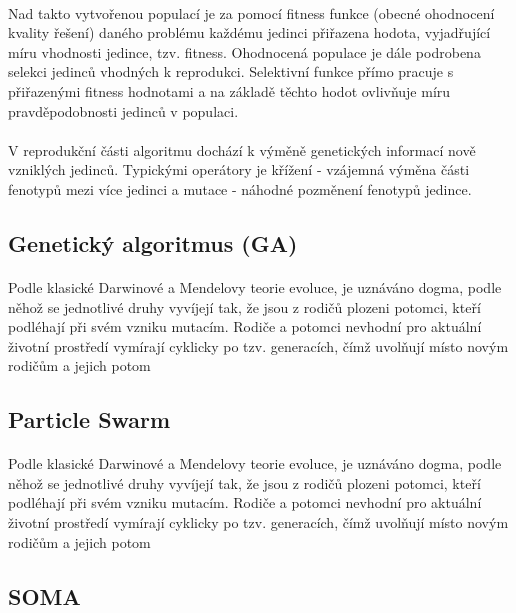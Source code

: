 \documentclass[bc,male,java,dept460]{diploma}		%
\begin{document}
\paragraph*{}
Nad takto vytvořenou populací je za pomocí fitness funkce (obecné ohodnocení kvality řešení) daného problému každému jedinci přiřazena hodota, vyjadřující míru vhodnosti jedince, tzv. fitness. Ohodnocená populace je dále podrobena selekci jedinců vhodných k reprodukci. Selektivní funkce přímo pracuje s přiřazenými fitness hodnotami a na základě těchto hodot ovlivňuje míru pravděpodobnosti jedinců v populaci.

\paragraph*{}
V reprodukční části algoritmu dochází k výměně genetických informací nově vzniklých jedinců. Typickými operátory je křížení - vzájemná výměna části fenotypů mezi více jedinci a mutace - náhodné pozměnení fenotypů jedince.

\subsection{Genetický algoritmus (GA)}
\paragraph*{}
Podle klasické Darwinové a Mendelovy teorie evoluce, je uznáváno dogma, podle něhož se jednotlivé druhy vyvíjejí tak, že jsou z rodičů plozeni potomci, kteří podléhají při svém vzniku mutacím. Rodiče a potomci nevhodní pro aktuální životní prostředí vymírají cyklicky po tzv. generacích, čímž uvolňují místo novým rodičům a jejich potom

\subsection{Particle Swarm}
\paragraph*{}
Podle klasické Darwinové a Mendelovy teorie evoluce, je uznáváno dogma, podle něhož se jednotlivé druhy vyvíjejí tak, že jsou z rodičů plozeni potomci, kteří podléhají při svém vzniku mutacím. Rodiče a potomci nevhodní pro aktuální životní prostředí vymírají cyklicky po tzv. generacích, čímž uvolňují místo novým rodičům a jejich potom

\subsection{SOMA}
\end{document}
